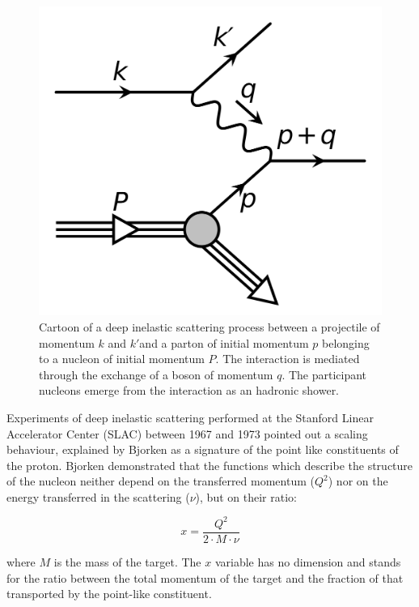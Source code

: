 \begin{figure}[!ht]
\begin{center}
\includegraphics[width=0.5\linewidth]{Chapters/Introduction/Figs/DIS.png}
\caption{Cartoon of a deep inelastic scattering process between a projectile of momentum $k$ and $k'$and a parton of initial momentum $p$ belonging to a nucleon of initial momentum $P$. The interaction is mediated through the exchange of a boson of momentum $q$. The participant nucleons emerge from the interaction as an hadronic shower.}
\label{fig:DIS}
\end{center}
\end{figure}

Experiments of deep inelastic scattering performed at the Stanford Linear Accelerator Center (SLAC) between 1967 and 1973 pointed out a scaling behaviour, explained by Bjorken as a signature of the point like constituents of the proton.
Bjorken demonstrated that the functions which describe the structure of the nucleon neither depend on the transferred momentum ($Q^2$) nor on the energy transferred in the scattering ($\nu$), but on their ratio:

\begin{equation}
    x = \frac{Q^2}{2\cdot M \cdot \nu}
\end{equation}

where $M$ is the mass of the target.
The $x$ variable has no dimension and stands for the ratio between the total momentum of the target and the fraction of that transported by the point-like constituent.


